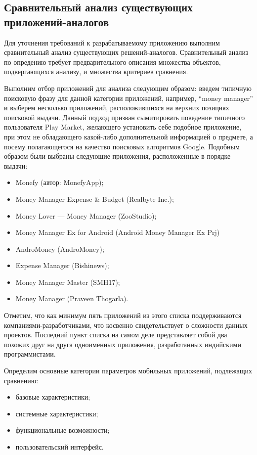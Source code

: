 \subsection{Сравнительный анализ существующих приложений-аналогов}
\label{subsec:system_spec_compare}

Для уточнения требований к разрабатываемому приложению
выполним сравнительный анализ существующих решений-аналогов.
Сравнительный анализ по опредению требует предварительного
описания множества объектов, подвергающихся анализу,
и множества критериев сравнения.

Выполним отбор приложений для анализа следующим образом:
введем типичную поисковую фразу для данной категории приложений,
например, ``money manager'' и выберем несколько приложений,
расположившихся на верхних позициях поисковой выдачи.
Данный подход призван сымитировать поведение типичного пользователя
Play Market, желающего установить себе подобное приложение,
при этом не обладающего какой-либо дополнительной информацией о предмете,
а посему полагающегося на качество поисковых алгоритмов Google.
Подобным образом были выбраны следующие приложения, расположенные
в порядке выдачи:
\begin{itemize}
\item Monefy (автор: MonefyApp);
\item Money Manager Expense \& Budget (Realbyte Inc.);
\item Money Lover --- Money Manager (ZooStudio);
\item Money Manager Ex for Android (Android Money Manager Ex Prj)
\item AndroMoney (AndroMoney);
\item Expense Manager (Bishinews);
\item Money Manager Master (SMH17);
\item Money Manager (Praveen Thogarla).
\end{itemize}

Отметим, что как минимум пять приложений из этого списка поддерживаются
компаниями-разработчиками, что косвенно свидетельствует о сложности данных проектов.
Последний пункт списка на самом деле представляет собой два похожих друг
на друга одноименных приложения, разработанных индийскими программистами.

Определим основные категории параметров мобильных приложений, подлежащих сравнению:
\begin{itemize}
\item базовые характеристики;
\item системные характеристики;
\item функциональные возможности;
\item пользовательский интерфейс.
\end{itemize}

